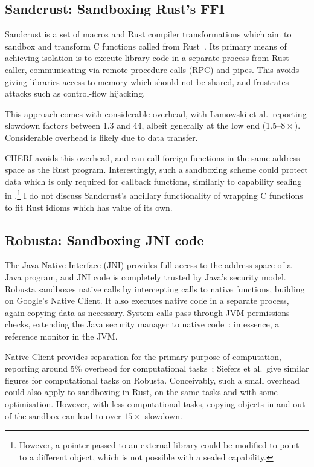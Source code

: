 \documentclass[dissertation.tex]{subfiles}
\begin{document}
\subsection{Sandcrust: Sandboxing Rust's FFI}
\label{sec:rel-sandcrust}

Sandcrust is a set of macros and Rust compiler transformations which aim
to sandbox and transform C functions called from
Rust~\cite{lamowski-sandcrust}.
Its primary means of achieving isolation is to execute library code in a
separate process from Rust caller, communicating via remote procedure
calls (RPC) and pipes.
This avoids giving libraries access to memory which should not be
shared, and frustrates attacks such as control-flow hijacking.

This approach comes with considerable overhead, with Lamowski et al.\
reporting slowdown factors between 1.3 and 44, albeit generally at the
low end (1.5--\(8\times\)).
Considerable overhead is likely due to data transfer.

CHERI avoids this overhead, and can call foreign functions in the same
address space as the Rust program.
Interestingly, such a sandboxing scheme could protect data which is only
required for callback functions, similarly to capability sealing in
\Cref{sec:eval-rust-xprocess}.\footnote{
    However, a pointer passed to an external library could be modified
    to point to a different object, which is not possible with a sealed
    capability.
}
I do not discuss Sandcrust's ancillary functionality of wrapping C
functions to fit Rust idioms which has value of its own.


\subsection{Robusta: Sandboxing JNI code}
The Java Native Interface (JNI) provides full access to the address
space of a Java program, and JNI code is completely trusted by Java's
security model.
Robusta sandboxes native calls by intercepting calls to native
functions, building on Google's Native Client.
It also executes native code in a separate process, again copying data
as necessary.
System calls pass through JVM permissions checks, extending the Java
security manager to native code~\cite{siefers-robusta}: in essence, a
reference monitor in the JVM.

Native Client provides separation for the primary purpose of
computation, reporting around 5\% overhead for computational
tasks~\cite{yee-nacl}; Siefers et al.\ give similar figures for
computational tasks on Robusta.
Conceivably, such a small overhead could also apply to sandboxing in
Rust, on the same tasks and with some optimisation.
However, with less computational tasks, copying objects in and out of
the sandbox can lead to over \(15\times\) slowdown.
\end{document}

